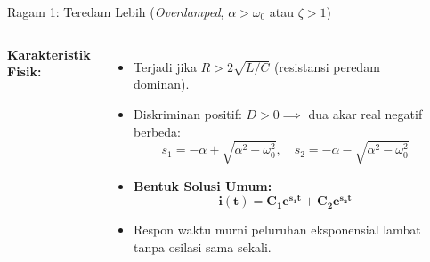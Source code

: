 \documentclass[aspectratio=169,10pt]{beamer}
\begin{document}
\begin{frame}{Ragam 1: Teredam Lebih (\textit{Overdamped}, $\alpha > \omega_0$ atau $\zeta > 1$)}
  \begin{columns}[c]
    \textbf{Karakteristik Fisik:}
    \begin{itemize}
      \item Terjadi jika $R > 2\sqrt{L/C}$ (resistansi peredam dominan).
      \item Diskriminan positif: $D > 0 \implies$ dua akar real negatif berbeda:
      \begin{equation*}
        s_1 = -\alpha + \sqrt{\alpha^2 - \omega_0^2}, \quad s_2 = -\alpha - \sqrt{\alpha^2 - \omega_0^2}
      \end{equation*}
      \item \textbf{Bentuk Solusi Umum:}
      \begin{equation*}
        \mathbf{i(t) = C_1 e^{s_1 t} + C_2 e^{s_2 t}}
      \end{equation*}
      \item Respon waktu murni peluruhan eksponensial lambat tanpa osilasi sama sekali.
    \end{itemize}

    \begin{center}
    \end{center}
  \end{columns}
\end{frame}
\end{document}
